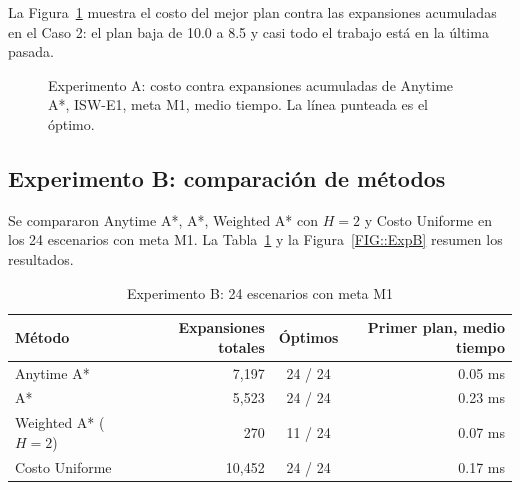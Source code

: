 La Figura~\ref{FIG::ExpA} muestra el costo del mejor plan contra las expansiones acumuladas en el Caso 2: el plan baja de 10.0 a 8.5 y casi todo el trabajo está en la última pasada.

\begin{figure}[H]
    \centering
    \caption{Experimento A: costo contra expansiones acumuladas de Anytime A*, ISW-E1, meta M1, medio tiempo. La línea punteada es el óptimo.}
    \label{FIG::ExpA}
\end{figure}

\subsection{Experimento B: comparación de métodos}
Se compararon Anytime A*, A*, Weighted A* con $H = 2$ y Costo Uniforme en los 24 escenarios con meta M1. La Tabla~\ref{TAB::ExpB} y la Figura~\ref{FIG::ExpB} resumen los resultados.

\begin{table}[H]
  \begin{center}
    \caption{Experimento B: 24 escenarios con meta M1}
    \label{TAB::ExpB}
    \begin{tabular}{|| l | r | c | r ||}
        \hline
        Método & Expansiones totales & Óptimos & Primer plan, medio tiempo \\ [0.5ex]
        \hline\hline
        Anytime A* & 7,197 & 24 / 24 & 0.05 ms \\
        \hline
        A* & 5,523 & 24 / 24 & 0.23 ms \\
        \hline
        Weighted A* ($H = 2$) & 270 & 11 / 24 & 0.07 ms \\
        \hline
        Costo Uniforme & 10,452 & 24 / 24 & 0.17 ms \\
        \hline
    \end{tabular}
  \end{center}
\end{table}

